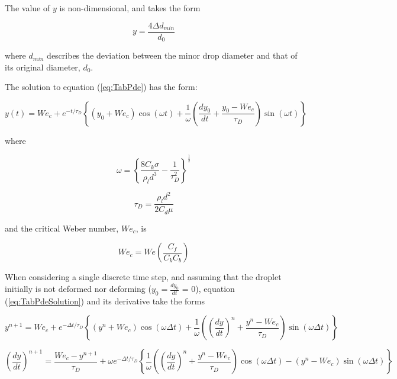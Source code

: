 \documentclass[12pt]{article}
\begin{document}
The value of $y$ is non-dimensional, and takes the form

\begin{equation}
y = \frac{4\Delta d_{min}}{d_{0}}
\end{equation}

where $d_{min}$ describes the deviation between the minor drop diameter and that of its original diameter, $d_{0}$.

The solution to equation (\ref{eq:TabPde}) has the form:

\begin{equation}\label{eq:TabPdeSolution}
y(t) = We_{c} + e^{-t/\tau_{D}}\left\{(y_{0} + We_{c})\cos{(\omega t) + \frac{1}{\omega}\left(\frac{dy_{0}}{dt} + \frac{y_{0} - We_{c}}{\tau_{D}}\right)\sin{(\omega t)}}\right\}
\end{equation}

where

\begin{equation}\label{eq:omega}
\omega = \left\{\frac{8C_{k}\sigma}{\rho_{l}d^{3}} - \frac{1}{\tau_{D}^{2}}\right\}^{\frac{1}{2}}
\end{equation}

\begin{equation}
\tau_{D} = \frac{\rho_{l}d^{2}}{2C_{d}\mu}
\end{equation}

and the critical Weber number, $We_{c}$, is

\begin{equation}
We_{c} = We\left(\frac{C_{f}}{C_{k}C_{b}}\right)
\end{equation}

When considering a single discrete time step, and assuming that the droplet initially is not deformed nor deforming ($y_{0} = \frac{dy_{0}}{dt}$ = 0), equation (\ref{eq:TabPdeSolution}) and its derivative take the forms

\begin{equation}\label{eq:TabPdeSolutionDiscretized}
y^{n+1} = We_{c} + e^{-\Delta t/\tau_{D}}\left\{(y^{n} + We_{c})\cos{(\omega \Delta t) + \frac{1}{\omega}\left(\left(\frac{dy}{dt}\right)^{n} + \frac{y^{n} - We_{c}}{\tau_{D}}\right)\sin{(\omega \Delta t)}}\right\}
\end{equation}

\begin{equation}\label{eq:TabPdeSolutionDiscretizedDeriv}
\left(\frac{dy}{dt}\right)^{n+1} = \frac{We_{c} - y^{n+1}}{\tau_{D}} + \omega e^{-\Delta t/\tau_{D}}\left\{\frac{1}{\omega}\left(\left(\frac{dy}{dt}\right)^{n} + \frac{y^{n} - We_{c}}{\tau_{D}}\right)\cos{(\omega \Delta t) - (y^{n} - We_{c})\sin{(\omega \Delta t)}}\right\}
\end{equation}
\end{document}
